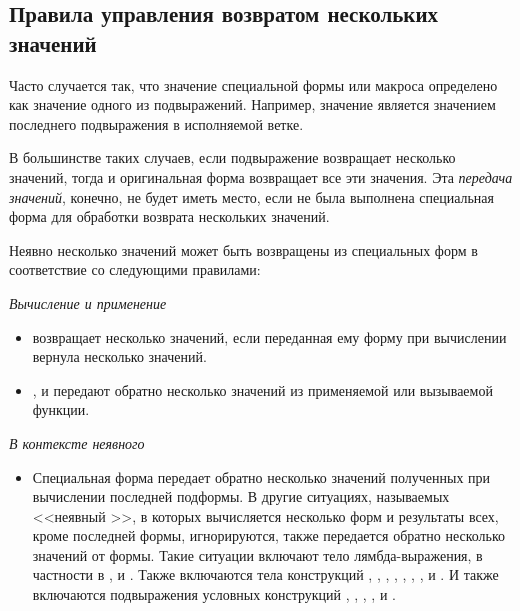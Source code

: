 \subsection{Правила управления возвратом нескольких значений}

Часто случается так, что значение специальной формы или макроса определено как
значение одного из подвыражений.
Например, значение  является значением последнего подвыражения в
исполняемой ветке.

В большинстве таких случаев, если подвыражение возвращает несколько значений,
тогда и оригинальная форма возвращает все эти значения. Эта \emph{передача
  значений}, конечно, не будет иметь место, если не была выполнена специальная
форма для обработки возврата нескольких значений.

Неявно несколько значений может быть возвращены из специальных форм в
соответствие со следующими правилами:
\goodbreak
\begin{flushdesc}
\item[\emph{Вычисление и применение}]\leavevmode
\begin{itemize}

\item
{} возвращает несколько значений, если переданная ему форму при
вычислении вернула несколько значений.

\item
{},  и  передают обратно
несколько значений из применяемой или вызываемой функции.
\end{itemize}

\item[\emph{В контексте неявного \cdf{progn}}]\leavevmode
\begin{itemize}

\item
Специальная форма 
передает обратно несколько значений полученных при вычислении последней
подформы. В другие ситуациях, называемых <<неявный >>, в которых
вычисляется несколько форм и результаты всех, кроме последней формы,
игнорируются, также передается обратно несколько значений от формы.
Такие ситуации включают тело лямбда-выражения, в частности в ,
 и .
Также включаются тела конструкций
,
, ,
, , ,
,
 и .
И также включаются подвыражения условных конструкций 
, ,
, ,  и .
\end{itemize}
\end{flushdesc}

